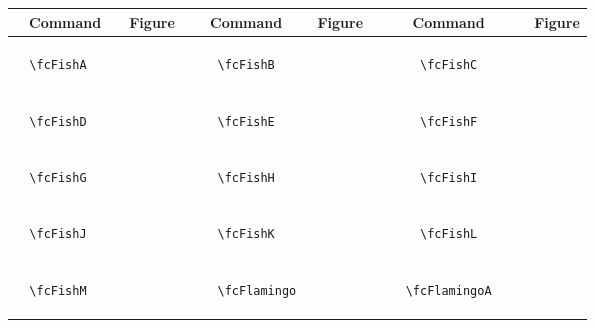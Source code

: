 \documentclass[x11names]{article}
\begin{document}
\begin{table}[H]\centering\begin{tabular}{|c|c|c|c|c|c|}\hline{\bf Command} & {\bf Figure} & {\bf Command} & {\bf Figure} & {\bf Command} & {\bf Figure}\\	\hline	&\multirow{5}{*}{	\fcFishA	[scale=0.8]} & &\multirow{5}{*}{	\fcFishB	[scale=0.6]} & &\multirow{5}{*}{	\fcFishC	[scale=0.6]}\\	& & & & & \\	& & & & & \\	\verb|	\fcFishA	| & & \verb|	\fcFishB	| & & \verb|	\fcFishC	| & \\	& & & & & \\	& & & & & \\	& & & & & \\	\hline									
		&\multirow{5}{*}{	\fcFishD	[scale=0.4]} & &\multirow{5}{*}{	\fcFishE	[scale=0.4]} & &\multirow{5}{*}{	\fcFishF	[scale=0.4]}\\	& & & & & \\	& & & & & \\	\verb|	\fcFishD	| & & \verb|	\fcFishE	| & & \verb|	\fcFishF	| & \\	& & & & & \\	& & & & & \\	& & & & & \\	\hline									
		&\multirow{5}{*}{	\fcFishG	[scale=0.4]} & &\multirow{5}{*}{	\fcFishH	[scale=0.4]} & &\multirow{5}{*}{	\fcFishI	[scale=0.4]}\\	& & & & & \\	& & & & & \\	\verb|	\fcFishG	| & & \verb|	\fcFishH	| & & \verb|	\fcFishI	| & \\	& & & & & \\	& & & & & \\	& & & & & \\	\hline									
		&\multirow{5}{*}{	\fcFishJ	[scale=0.4]} & &\multirow{5}{*}{	\fcFishK	[scale=0.4]} & &\multirow{5}{*}{	\fcFishL	[scale=0.4]}\\	& & & & & \\	& & & & & \\	\verb|	\fcFishJ	| & & \verb|	\fcFishK	| & & \verb|	\fcFishL	| & \\	& & & & & \\	& & & & & \\	& & & & & \\	\hline									
		&\multirow{5}{*}{	\fcFishM	[scale=0.4]} & &\multirow{5}{*}{	\fcFlamingo	[scale=0.8]} & &\multirow{5}{*}{	\fcFlamingoA	[scale=0.8]}\\	& & & & & \\	& & & & & \\	\verb|	\fcFishM	| & & \verb|	\fcFlamingo	| & & \verb|	\fcFlamingoA	| & \\	& & & & & \\	& & & & & \\	& & & & & \\	\hline									

\end{tabular}
\end{table}
\end{document}
